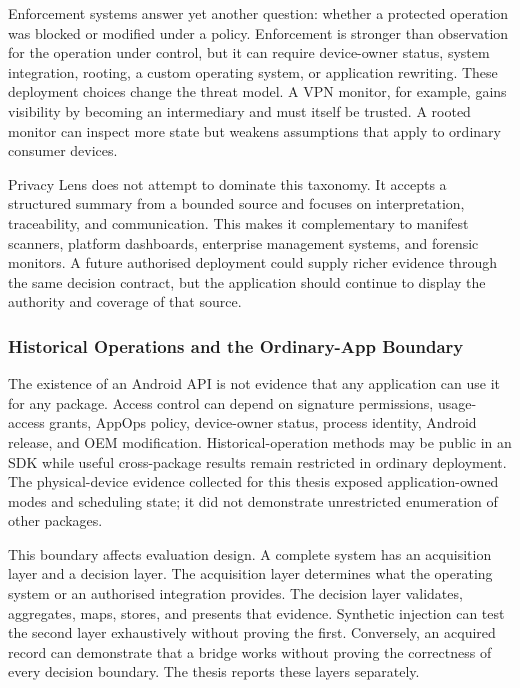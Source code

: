 Enforcement systems answer yet another question: whether a protected operation was blocked or modified under a policy. Enforcement is stronger than observation for the operation under control, but it can require device-owner status, system integration, rooting, a custom operating system, or application rewriting. These deployment choices change the threat model. A VPN monitor, for example, gains visibility by becoming an intermediary and must itself be trusted. A rooted monitor can inspect more state but weakens assumptions that apply to ordinary consumer devices.

Privacy Lens does not attempt to dominate this taxonomy. It accepts a structured summary from a bounded source and focuses on interpretation, traceability, and communication. This makes it complementary to manifest scanners, platform dashboards, enterprise management systems, and forensic monitors. A future authorised deployment could supply richer evidence through the same decision contract, but the application should continue to display the authority and coverage of that source.

\subsubsection{Historical Operations and the Ordinary-App Boundary}

The existence of an Android API is not evidence that any application can use it for any package. Access control can depend on signature permissions, usage-access grants, AppOps policy, device-owner status, process identity, Android release, and OEM modification. Historical-operation methods may be public in an SDK while useful cross-package results remain restricted in ordinary deployment. The physical-device evidence collected for this thesis exposed application-owned modes and scheduling state; it did not demonstrate unrestricted enumeration of other packages.

This boundary affects evaluation design. A complete system has an acquisition layer and a decision layer. The acquisition layer determines what the operating system or an authorised integration provides. The decision layer validates, aggregates, maps, stores, and presents that evidence. Synthetic injection can test the second layer exhaustively without proving the first. Conversely, an acquired record can demonstrate that a bridge works without proving the correctness of every decision boundary. The thesis reports these layers separately.

